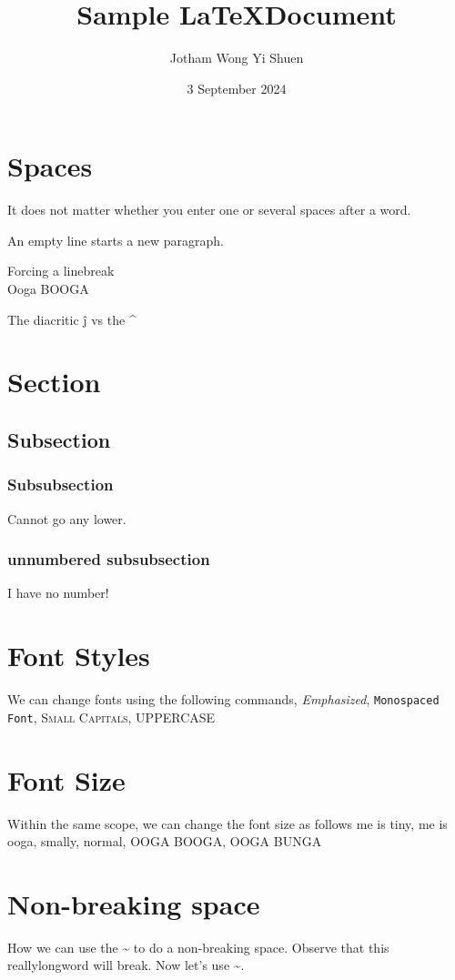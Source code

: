 \documentclass[12pt]{article}
\title{Sample \LaTeX Document}
\author{Jotham Wong Yi Shuen}
\date{3 September 2024}
\begin{document}
    \maketitle
    \tableofcontents

    \section{Spaces}
    It does not matter whether you
    enter one or several             spaces
    after a word.

    An empty line starts a new
    paragraph.
    
    Forcing a linebreak\\
    Ooga BOOGA

    The diacritic \^j vs the \^{}

    \section{Section}
    \subsection{Subsection}
    \subsubsection{Subsubsection}
    Cannot go any lower.
    \subsubsection*{unnumbered subsubsection}
    I have no number!

    \section{Font Styles}

    We can change fonts using the following commands, \emph{Emphasized}, \texttt{Monospaced Font}, \textsc{Small Capitals}, \uppercase{uppercase}

    \section{Font Size}

    Within the same scope, we can change the font size as follows {\tiny me is tiny}, {\scriptsize me is ooga}, {\small smally}, {\normalsize normal}, {\LARGE OOGA BOOGA}, {\Huge OOGA BUNGA}

    \section{Non-breaking space}
    How we can use the \~{} to do a non-breaking space. Observe that this reallylongword will break. Now let's use \~{}.
\end{document}

